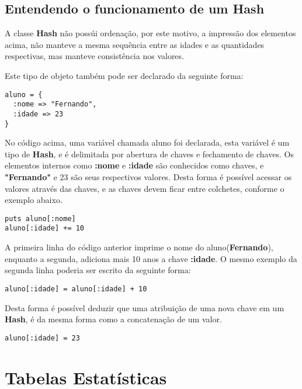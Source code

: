 \documentclass[12pt]{article}
\newcommand{\code}[1] {\textbf{#1}}
\begin{document}
\subsection { Entendendo o funcionamento de um Hash }

A classe \code{Hash} não possúi ordenação, por este motivo, a impressão dos elementos acima, não manteve a mesma sequência entre as idades e as quantidades respectivas, mas manteve consistência nos valores.

Este tipo de objeto também pode ser declarado da seguinte forma:

\begin{lstlisting}[caption=Sintaxe de declaração de um \code{Hash}]
aluno = { 
  :nome => "Fernando",
  :idade => 23
}
\end{lstlisting}

No código acima, uma variável chamada aluno foi declarada, esta variável é um tipo de \code{Hash}, e é delimitada por abertura de chaves e fechamento de chaves. Os elementos internos como \code{:nome} e \code{:idade} são conhecidos como chaves, e \code{"Fernando"} e 23 são seus respectivos valores. Desta forma é possível acessar os valores através das chaves, e as chaves devem ficar entre colchetes, conforme o exemplo abaixo. 


\begin{lstlisting}[caption=Usufruindo dos métodos do \code{Hash}]
puts aluno[:nome] 
aluno[:idade] += 10
\end{lstlisting}

A primeira linha do código anterior imprime o nome do aluno(\code{Fernando}), enquanto a segunda, adiciona mais 10 anos a chave \code{:idade}. O mesmo exemplo da segunda linha poderia ser escrito da seguinte forma:

\begin{lstlisting}[caption=Somando 10 anos a chave :idade]
aluno[:idade] = aluno[:idade] + 10
\end{lstlisting}

Desta forma é possível deduzir que uma atribuição de uma nova chave em um \code{Hash}, é da mesma forma como a concatenação de um valor.

\begin{lstlisting}[caption=Atribuindo o valor 23 para a chave :idade da variável aluno]
aluno[:idade] = 23 
\end{lstlisting}

\section { Tabelas Estatísticas }
\end{document}
